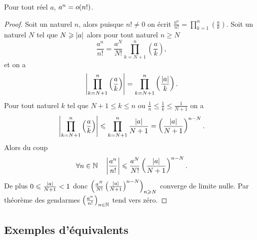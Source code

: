           \begin{prop}
            Pour tout réel \(a\), \(a^n = o\mathopen{}\left(n!\right)\).
          \end{prop}
          \begin{proof}
            Soit un naturel \(n\), alors puisque \(n! \neq 0\) on écrit 
            \(\frac{a^n}{n!}=\prod_{k = 1}^n \left(\frac{a}{k}\right)\). Soit un 
            naturel \(N\) tel que \(N \geqslant \left\lvert a\right\rvert\) alors pour tout 
            naturel \(n \geqslant N\)
            \begin{equation}
              \frac{a^n}{n!} = \frac{a^N}{N!} \prod_{k = N+1}^n 
              \left(\frac{a}{k}\right),
            \end{equation}
            et on a
            \begin{equation}
              \left\lvert\prod_{k = N+1}^n \left(\frac{a}{k}\right)\right\rvert = \prod_{k = 
              N+1}^n \left(\frac{\left\lvert a\right\rvert}{k}\right).
            \end{equation}
            Pour tout naturel \(k\) tel que \(N+1 \leqslant k \leqslant n\) ou 
            \(\frac{1}{n} \leqslant \frac{1}{k} \leqslant \frac{1}{N+1}\) on a
            \begin{equation}
              \left\lvert\prod_{k = N+1}^n \left(\frac{a}{k}\right)\right\rvert \leqslant 
              \prod_{k = N+1}^n \frac{\left\lvert a\right\rvert}{N+1} = 
              \left(\frac{\left\lvert a\right\rvert}{N+1}\right)^{n-N}.
            \end{equation}
            Alors du coup
            \begin{equation}
              \forall n \in \mathbb{N} \quad \left\lvert\frac{a^n}{n!}\right\rvert \leqslant 
              \frac{a^N}{N!} \left(\frac{\left\lvert a\right\rvert}{N+1}\right)^{n-N}.
            \end{equation}
            De plus \(0 \leqslant \frac{\left\lvert a\right\rvert}{N+1} < 1\) donc 
            \(\left(\frac{a^N}{N!} 
            \left(\frac{\left\lvert a\right\rvert}{N+1}\right)^{n-N}\right)_{n \geqslant N}\) 
            converge de limite nulle. Par théorème des gendarmes 
            \(\left(\frac{a^n}{n!}\right)_{n\in \mathbb{N}}\) tend vers zéro.
          \end{proof}

          \subsection{Exemples d'équivalents}

